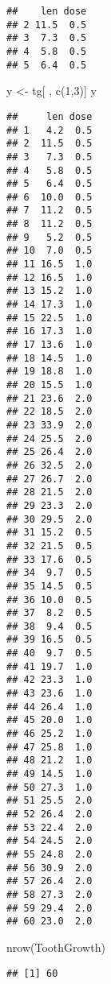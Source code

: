 \documentclass[
]{article}
\newenvironment{Shaded}{\begin{snugshade}}{\end{snugshade}}
\newcommand{\DecValTok}[1]{\textcolor[rgb]{0.00,0.00,0.81}{#1}}
\newcommand{\FunctionTok}[1]{\textcolor[rgb]{0.00,0.00,0.00}{#1}}
\newcommand{\NormalTok}[1]{#1}
\newcommand{\OtherTok}[1]{\textcolor[rgb]{0.56,0.35,0.01}{#1}}
\newcommand{\SpecialCharTok}[1]{\textcolor[rgb]{0.00,0.00,0.00}{#1}}
\begin{document}
\begin{verbatim}
##    len dose
## 2 11.5  0.5
## 3  7.3  0.5
## 4  5.8  0.5
## 5  6.4  0.5
\end{verbatim}

\begin{Shaded}
\begin{Highlighting}[]
\NormalTok{y }\OtherTok{\textless{}{-}}\NormalTok{ tg[ , }\FunctionTok{c}\NormalTok{(}\DecValTok{1}\NormalTok{,}\DecValTok{3}\NormalTok{)]}
\NormalTok{y}
\end{Highlighting}
\end{Shaded}

\begin{verbatim}
##     len dose
## 1   4.2  0.5
## 2  11.5  0.5
## 3   7.3  0.5
## 4   5.8  0.5
## 5   6.4  0.5
## 6  10.0  0.5
## 7  11.2  0.5
## 8  11.2  0.5
## 9   5.2  0.5
## 10  7.0  0.5
## 11 16.5  1.0
## 12 16.5  1.0
## 13 15.2  1.0
## 14 17.3  1.0
## 15 22.5  1.0
## 16 17.3  1.0
## 17 13.6  1.0
## 18 14.5  1.0
## 19 18.8  1.0
## 20 15.5  1.0
## 21 23.6  2.0
## 22 18.5  2.0
## 23 33.9  2.0
## 24 25.5  2.0
## 25 26.4  2.0
## 26 32.5  2.0
## 27 26.7  2.0
## 28 21.5  2.0
## 29 23.3  2.0
## 30 29.5  2.0
## 31 15.2  0.5
## 32 21.5  0.5
## 33 17.6  0.5
## 34  9.7  0.5
## 35 14.5  0.5
## 36 10.0  0.5
## 37  8.2  0.5
## 38  9.4  0.5
## 39 16.5  0.5
## 40  9.7  0.5
## 41 19.7  1.0
## 42 23.3  1.0
## 43 23.6  1.0
## 44 26.4  1.0
## 45 20.0  1.0
## 46 25.2  1.0
## 47 25.8  1.0
## 48 21.2  1.0
## 49 14.5  1.0
## 50 27.3  1.0
## 51 25.5  2.0
## 52 26.4  2.0
## 53 22.4  2.0
## 54 24.5  2.0
## 55 24.8  2.0
## 56 30.9  2.0
## 57 26.4  2.0
## 58 27.3  2.0
## 59 29.4  2.0
## 60 23.0  2.0
\end{verbatim}

\begin{Shaded}
\begin{Highlighting}[]
\FunctionTok{nrow}\NormalTok{(ToothGrowth)}
\end{Highlighting}
\end{Shaded}

\begin{verbatim}
## [1] 60
\end{verbatim}

\begin{Shaded}
\end{Shaded}
\end{document}
